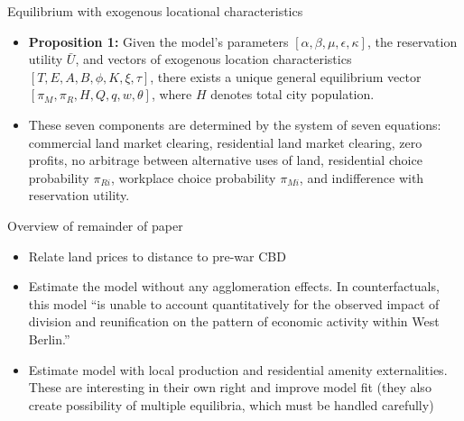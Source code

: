 \documentclass[11pt,notes=hide,aspectratio=169]{beamer}
\begin{document}
\begin{frame}{Equilibrium with exogenous locational characteristics}
\begin{itemize}
\item \textbf{Proposition 1:} Given the model's parameters $[\alpha,\beta,\mu,\epsilon,\kappa]$, the reservation utility $\bar{U}$, and vectors of exogenous location characteristics $[T,E,A,B,\phi,K,\xi,\tau]$, there exists a unique general equilibrium vector $[\pi_{M},\pi_{R},H,Q,q,w,\theta]$, where $H$ denotes total city population. 
\item These seven components are determined by the system of seven equations: 
commercial land market clearing, %
residential land market clearing, %
zero profits, %
no arbitrage between alternative uses of land, %
residential choice probability $\pi_{Ri}$, %
workplace choice probability $\pi_{Mi}$, %
and indifference with reservation utility. %
\end{itemize}
\end{frame}
\begin{frame}{Overview of remainder of paper}
\begin{itemize}
\item Relate land prices to distance to pre-war CBD
\item Estimate the model without any agglomeration effects. In counterfactuals, this model ``is unable to account quantitatively for the observed impact of division and reunification on the pattern of economic activity within West Berlin.''
\item Estimate model with local production and residential amenity externalities. These are interesting in their own right and improve model fit (they also create possibility of multiple equilibria, which must be handled carefully)
\end{itemize}
\end{frame}
\end{document}
